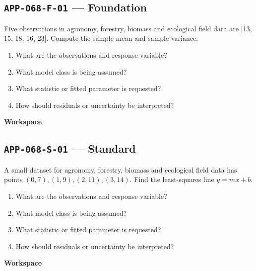 \documentclass[11pt]{book}
\newcommand{\pid}[1]{\texttt{#1}}
\newcommand{\workspace}{\par\vspace{0.7in}\hrulefill\par\vspace{0.55in}\hrulefill\par}
\begin{document}
\subsection*{\pid{APP-068-F-01} — Foundation}
\begin{problembox}
Five observations in agronomy, forestry, biomass and ecological field data are [13, 15, 18, 16, 23]. Compute the sample mean and sample variance.
\end{problembox}
\begin{promptbox}\begin{enumerate}
\item What are the observations and response variable?
\item What model class is being assumed?
\item What statistic or fitted parameter is requested?
\item How should residuals or uncertainty be interpreted?
\end{enumerate}\end{promptbox}
\textbf{Workspace}\workspace
{}
\subsection*{\pid{APP-068-S-01} — Standard}
\begin{problembox}
A small dataset for agronomy, forestry, biomass and ecological field data has points $(0,7),(1,9),(2,11),(3,14)$. Find the least-squares line $y=mx+b$.
\end{problembox}
\begin{promptbox}\begin{enumerate}
\item What are the observations and response variable?
\item What model class is being assumed?
\item What statistic or fitted parameter is requested?
\item How should residuals or uncertainty be interpreted?
\end{enumerate}\end{promptbox}
\textbf{Workspace}\workspace
{}
\end{document}
